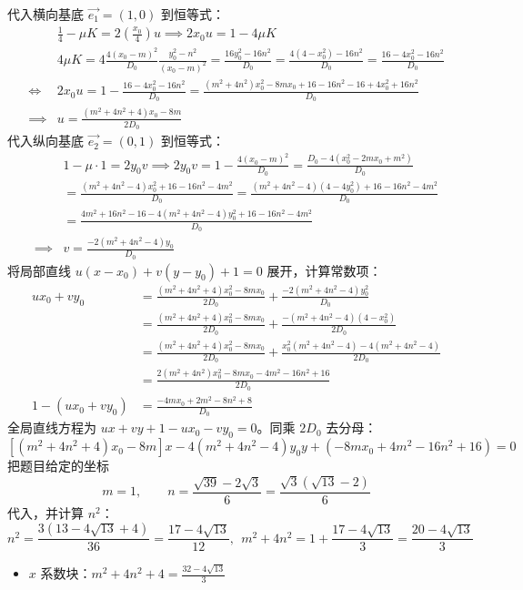\begin{solution}
代入横向基底 $\vec{e_1} = (1,0)$ 到恒等式：
\begin{align*}
& \frac{1}{4} - \mu K = 2\left(\frac{x_0}{4}\right)u \implies 2x_0 u = 1 - 4\mu K\\
& 4\mu K = 4 \frac{4(x_0-m)^2}{D_0} \frac{y_0^2 - n^2}{(x_0-m)^2} = \frac{16y_0^2 - 16n^2}{D_0} = \frac{4(4-x_0^2) - 16n^2}{D_0} = \frac{16 - 4x_0^2 - 16n^2}{D_0}\\
\Leftrightarrow & 2x_0 u = 1 - \frac{16 - 4x_0^2 - 16n^2}{D_0} = \frac{(m^2 + 4n^2)x_0^2 - 8mx_0 + 16 - 16n^2 - 16 + 4x_0^2 + 16n^2}{D_0}\\
\implies & u = \frac{(m^2 + 4n^2 + 4)x_0 - 8m}{2 D_0}
\end{align*}
代入纵向基底 $\vec{e_2} = (0,1)$ 到恒等式：
\begin{align*}
& 1 - \mu \cdot 1 = 2y_0 v \implies 2y_0 v = 1 - \frac{4(x_0-m)^2}{D_0} = \frac{D_0 - 4(x_0^2 - 2mx_0 + m^2)}{D_0}\\
& = \frac{(m^2 + 4n^2 - 4)x_0^2 + 16 - 16n^2 - 4m^2}{D_0}=\frac{(m^2 + 4n^2 - 4)(4 - 4y_0^2) + 16 - 16n^2 - 4m^2 }{D_0}\\
& = \frac{4m^2 + 16n^2 - 16 - 4(m^2 + 4n^2 - 4)y_0^2 + 16 - 16n^2 - 4m^2}{D_0}\\
\implies & v = \frac{-2(m^2 + 4n^2 - 4)y_0}{D_0}
\end{align*}
将局部直线 $u(x-x_0) + v(y-y_0) + 1 = 0$ 展开，计算常数项：
\begin{align*}
ux_0 + vy_0 &= \frac{(m^2 + 4n^2 + 4)x_0^2 - 8mx_0}{2 D_0} + \frac{-2(m^2 + 4n^2 - 4)y_0^2}{D_0}\\
&=  \frac{(m^2 + 4n^2 + 4)x_0^2 - 8mx_0}{2 D_0} +\frac{-(m^2 + 4n^2 - 4)(4-x_0^2)}{2 D_0}\\
&=  \frac{(m^2 + 4n^2 + 4)x_0^2 - 8mx_0}{2 D_0} +\frac{x_0^2(m^2 + 4n^2 - 4)-4(m^2 + 4n^2 - 4)}{2D_0}\\
&= \frac{2(m^2 + 4n^2)x_0^2 - 8mx_0 - 4m^2 - 16n^2 + 16}{2 D_0}\\
1 - (ux_0 + vy_0) &= \frac{-4mx_0 + 2m^2 - 8n^2 + 8}{D_0}
\end{align*}
全局直线方程为 $ux + vy + 1 - ux_0 - vy_0 = 0$。同乘 $2 D_0$ 去分母：
$$[(m^2 + 4n^2 + 4)x_0 - 8m]x - 4(m^2 + 4n^2 - 4)y_0 y + (-8mx_0 + 4m^2 - 16n^2 + 16) = 0$$
把题目给定的坐标
$$m = 1, \qquad n = \frac{\sqrt{39} - 2\sqrt{3}}{6} = \frac{\sqrt{3}(\sqrt{13} - 2)}{6}$$
代入，并计算 $n^2$：
$$n^2 = \frac{3(13 - 4\sqrt{13} + 4)}{36} = \frac{17 - 4\sqrt{13}}{12},~~m^2 + 4n^2 = 1 + \frac{17 - 4\sqrt{13}}{3} = \frac{20 - 4\sqrt{13}}{3}$$
\begin{itemize}
\item $x$ 系数块：$m^2 + 4n^2 + 4 = \frac{32 - 4\sqrt{13}}{3}$

\end{itemize}
\end{solution}
